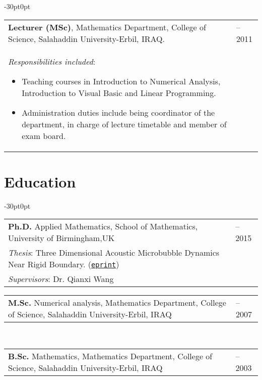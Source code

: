 \documentclass[line]{res}
\newenvironment{p1}
{\begin{adjustwidth}{-30pt}{0pt}
\vspace{8pt}}
{\end{adjustwidth}}
\begin{document}
\begin{resume}
\begin{p1}
\vspace{2pt}
\begin{tabular}{p{} >{\raggedleft\arraybackslash}p{}}
	\textbf{Lecturer (MSc)}, Mathematics Department, College of Science, Salahaddin University-Erbil, IRAQ.  & 2007--2011 \\
	\textit{Responsibilities included}:
	\begin{itemize}
		\item Teaching courses in Introduction to Numerical Analysis, Introduction to Visual Basic and Linear Programming.
		\item Administration duties include being coordinator of the department, in charge of lecture timetable and member of exam board.
	\end{itemize}
\end{tabular}
\end{p1}



\section{Education}

\begin{p1}
\begin{tabular}{p{} >{\raggedleft\arraybackslash}p{}}
	\textbf{Ph.D.} Applied Mathematics, School of Mathematics, University of Birmingham,UK & 2011--2015 \\
	\textit{Thesis}: Three Dimensional Acoustic Microbubble Dynamics Near Rigid Boundary. (\href{https://etheses.bham.ac.uk/id/eprint/5749/}{\texttt{eprint}}) & \\
	\textit{Supervisors}: Dr. Qianxi Wang & \\
\end{tabular}

\vspace{5pt}
\begin{tabular}{p{} >{\raggedleft\arraybackslash}p{}}
	\textbf{M.Sc.} Numerical analysis, Mathematics Department, College of Science, Salahaddin University-Erbil, IRAQ &  2005--2007\\
\end{tabular} \\

\vspace{5pt}
\begin{tabular}{p{} >{\raggedleft\arraybackslash}p{}}
	\textbf{B.Sc.} Mathematics, Mathematics Department, College of Science, Salahaddin University-Erbil, IRAQ &  1999--2003\\
\end{tabular} \\
\end{p1}


\end{resume}
\end{document}
